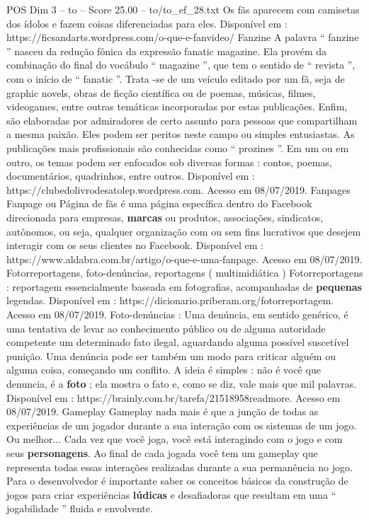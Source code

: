 \begin{textsample}{POS Dim 3 – to – Score 25.00 – to/to\_ef\_28.txt}
Os fãs aparecem com camisetas dos ídolos e fazem coisas diferenciadas para eles.
Disponível em : https://ficsandarts.wordpress.com/o-que-e-fanvideo/ Fanzine A palavra “ fanzine ” nasceu da redução fônica da expressão fanatic magazine.
Ela provém da combinação do final do vocábulo “ magazine ”, que tem o sentido de “ revista ”, com o início de “ fanatic ”.
Trata -se de um veículo editado por um fã, seja de graphic novels, obras de ficção científica ou de poemas, músicas, filmes, videogames, entre outras temáticas incorporadas por estas publicações.
Enfim, são elaboradas por admiradores de certo assunto para pessoas que compartilham a mesma paixão.
Eles podem ser peritos neste campo ou simples entusiastas.
As publicações mais profissionais são conhecidas como “ prozines ”.
Em um ou em outro, os temas podem ser enfocados sob diversas formas : contos, poemas, documentários, quadrinhos, entre outros.
Disponível em : https://clubedolivrodesatolep.wordpress.com.
Acesso em 08/07/2019.
Fanpages Fanpage ou Página de fãs é uma página específica dentro do Facebook direcionada para empresas, \textbf{marcas} ou produtos, associações, sindicatos, autônomos, ou seja, qualquer organização com ou sem fins lucrativos que desejem interagir com os seus clientes no Facebook.
Disponível em : https://www.aldabra.com.br/artigo/o-que-e-uma-fanpage.
Acesso em 08/07/2019.
Fotorreportagens, foto-denúncias, reportagens ( multimidiática ) Fotorreportagens : reportagem essencialmente baseada em fotografias, acompanhadas de \textbf{pequenas} legendas.
Disponível em : https://dicionario.priberam.org/fotorreportagem.
Acesso em 08/07/2019.
Foto-denúncias : Uma denúncia, em sentido genérico, é uma tentativa de levar ao conhecimento público ou de alguma autoridade competente um determinado fato ilegal, aguardando alguma possível suscetível punição.
Uma denúncia pode ser também um modo para criticar alguém ou alguma coisa, começando um conflito.
A ideia é simples : não é você que denuncia, é a \textbf{foto} ; ela mostra o fato e, como se diz, vale mais que mil palavras.
Disponível em : https://brainly.com.br/tarefa/21518958readmore.
Acesso em 08/07/2019.
Gameplay Gameplay nada mais é que a junção de todas as experiências de um jogador durante a sua interação com os sistemas de um jogo.
Ou melhor...
Cada vez que você joga, você está interagindo com o jogo e com seus \textbf{personagens}.
Ao final de cada jogada você tem um gameplay que representa todas essas interações realizadas durante a sua permanência no jogo.
Para o desenvolvedor é importante saber os conceitos básicos da construção de jogos para criar experiências \textbf{lúdicas} e desafiadoras que resultam em uma “ jogabilidade ” fluida e envolvente.

\end{textsample}
